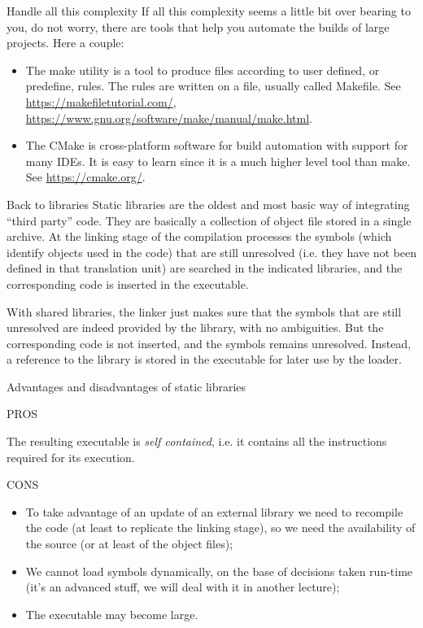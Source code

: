 \documentclass[12pt,aspectratio=169]{beamer}
\begin{document}
\begin{frame}{Handle all this complexity}
  If all this complexity seems a little bit over bearing to you, do not worry, there are tools that help you automate the builds of large projects. Here a couple:
  \begin{itemize}
    \item The \alert{make} utility is a tool to produce files according to user
    defined, or predefine, rules. The rules are written on a file, usually called {\color{blue} Makefile}. See \url{https://makefiletutorial.com/}, \url{https://www.gnu.org/software/make/manual/make.html}.
    \item The \alert{CMake} is cross-platform software for build automation with support for many IDEs. It is easy to learn since it is a much higher level tool than make. See \url{https://cmake.org/}.
  \end{itemize}
\end{frame}


\begin{frame}{Back to libraries}
\alert{Static} libraries are the oldest and most basic way of integrating
``third party'' code. They are basically a collection of object file
stored in a single archive. 
At the linking stage of the compilation processes the symbols
(which identify objects used in the code) that are still unresolved
(i.e. they have not been defined in that translation unit) are
searched in the indicated libraries, and the corresponding code is
inserted in the executable.
\smallskip

With \alert{shared} libraries, the linker just makes sure that the symbols that are still
unresolved are indeed provided by the library, with no ambiguities.
But the corresponding code is not inserted, and the symbols
remains unresolved. Instead, a reference to the library is stored in
the executable for later use by the loader.
\end{frame}

\begin{frame}{Advantages and disadvantages of static libraries}
  \begin{center}
    \alert{PROS}
    \end{center}
    The resulting executable is \emph{self contained}, i.e. it contains all
    the instructions required for its execution.
    \begin{center}
    \alert{CONS}
    \end{center}
    \begin{itemize}
    \item To take advantage of an update of an external library we need to
      \alert{recompile the code} (at least to replicate the linking
      stage), so we need the availability of the source (or at least of the
      object files);
    \item We cannot load  symbols dynamically, on the base of decisions
      taken run-time (it's an advanced stuff, we will deal with it in another lecture);
    \item The executable may become large.
    \end{itemize}
\end{frame}
\end{document}
